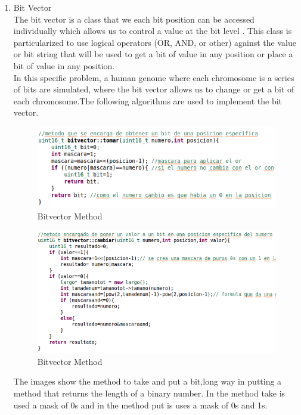 \documentclass[twocolumn]{IEEEtran}
\begin{document}
\begin{enumerate}
    	\item Bit Vector\\
        The bit vector is a class that we each bit position can be accessed individually which allows us to control a value at the bit level \cite{2}. This class is particularized to use logical operators (OR, AND, or other) against the value or bit string that will be used to get a bit of value in any position or place a bit of value in any position.\\ 
        In this specific problem, a human genome where each chromosome is a series of bits are simulated, where the bit vector allows us to change or get a bit of each chromosome\cite{36}.The following algorithms are used to implement the bit vector.\\ 
        \begin{figure}[h!]
        \centering
        \includegraphics[width=\columnwidth]{src/bitvectortomar.png}
        \caption{Bitvector Method}
        \end{figure}
        
        \begin{figure}[h!]
        \centering
        \includegraphics[width=\columnwidth]{src/bitvectorponer.png}
        \caption{Bitvector Method}
        \end{figure}
        The images show the method to take and put a bit,long way in putting a method that returns the length of a binary number. In the method take is used a mask\cite{35} of 0s and in the method put is uses a mask of 0s and 1s.

\end{enumerate}
\end{document}
